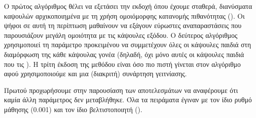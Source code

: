 \begin{description}
    \item[] 
    \item[]  
    \item[]   
\end{description}

Ο πρώτος αλγόριθμος θέλει να εξετάσει την εκδοχή όπου έχουμε σταθερά, διανύσματα καψουλών αρχικοποιημένα με τη χρήση ομοιόμορφης κατανομής πιθανότητας (). Οι ψήφοι σε αυτή τη περίπτωση μαθαίνουν να εξάγουν εύρωστες αναπαραστάσεις που παρουσιάζουν μεγάλη ομοιότητα με τις κάψουλες εξόδου. Ο δεύτερος αλγόριθμος χρησιμοποιεί τη παράμετρο  προκειμένου να συμμετέχουν όλες οι κάψουλες παιδιά στη διαμόρφωση της κάθε κάψουλας γονέα (δηλαδή, όχι μόνο αυτές οι κάψουλες παιδιά που τις ). Η τρίτη έκδοση της μεθόδου είναι όσο πιο πιστή γίνεται στον αλγόριθμο  αφού χρησιμοποιούμε και μια (διακριτή) συνάρτηση γειτνίασης.\par

Πρωτού προχωρήσουμε στην παρουσίαση των αποτελεσμάτων να αναφέρουμε ότι καμία άλλη παράμετρος δεν μεταβλήθηκε. Όλα τα πειράματα έγιναν με τον ίδιο ρυθμό μάθησης (0.001) και τον ίδιο βελτιστοποιητή ().

